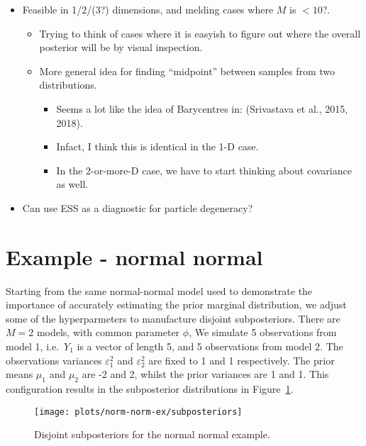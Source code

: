 \documentclass[10pt,a4paper,]{article}
\providecommand{\tightlist}{%
  \setlength{\itemsep}{0pt}\setlength{\parskip}{0pt}}
\newcommand{\Nm}{M}
\begin{document}
\begin{itemize}
\tightlist
\item
  Feasible in 1/2/(3?) dimensions, and melding cases where \(\Nm\) is
  \(<10\)?.

  \begin{itemize}
  \tightlist
  \item
    Trying to think of cases where it is easyish to figure out where the
    overall posterior will be by visual inspection.
  \item
    More general idea for finding ``midpoint'' between samples from two
    distributions.

    \begin{itemize}
    \tightlist
    \item
      Seems a lot like the idea of Barycentres in: (Srivastava et al.,
      2015, 2018).
    \item
      Infact, I think this is identical in the 1-D case.
    \item
      In the 2-or-more-D case, we have to start thinking about
      covariance as well.
    \end{itemize}
  \end{itemize}
\item
  Can use ESS as a diagnostic for particle degeneracy?
\end{itemize}

\section{Example - normal normal}\label{example---normal-normal}

Starting from the same normal-normal model used to demonstrate the
importance of accurately estimating the prior marginal distribution, we
adjust some of the hyperparmeters to manufacture disjoint subposteriors.
There are \(\Nm = 2\) models, with common parameter \(\phi\),
 We simulate 5
observations from model 1, i.e.~\(Y_{1}\) is a vector of length 5, and 5
observations from model 2. The observations variances
\(\varepsilon_{1}^{2}\) and \(\varepsilon_{2}^{2}\) are fixed to 1 and 1
respectively. The prior means \(\mu_{1}\) and \(\mu_{2}\) are -2 and 2,
whilst the prior variances are 1 and 1. This configuration results in
the subposterior distributions in Figure~\ref{fig:subposteriors}.

\begin{figure}

{\centering \texttt{[image: plots/norm-norm-ex/subposteriors]} 

}

\caption{Disjoint subposteriors for the normal normal example.}\label{fig:subposteriors}
\end{figure}
\end{document}

